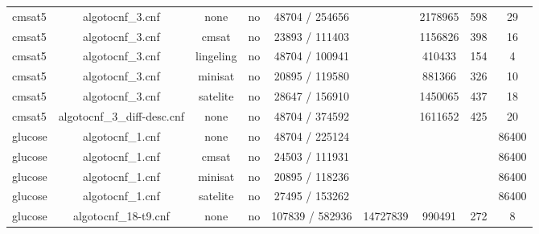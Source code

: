 \begin{appendices}
\begin{table}[p]
\begin{center}
\begin{tabular}{l|cccccccc}
  cmsat5                         & algotocnf\_3.cnf               & none       & no    & 48704 / 254656 &           & 2178965   & 598        & 29 \\ %
  cmsat5                         & algotocnf\_3.cnf               & cmsat      & no    & 23893 / 111403 &           & 1156826   & 398        & 16 \\ %
  cmsat5                         & algotocnf\_3.cnf               & lingeling  & no    & 48704 / 100941 &           & 410433    & 154        & 4 \\ %
  cmsat5                         & algotocnf\_3.cnf               & minisat    & no    & 20895 / 119580 &           & 881366    & 326        & 10 \\ %
  cmsat5                         & algotocnf\_3.cnf               & satelite   & no    & 28647 / 156910 &           & 1450065   & 437        & 18 \\ %
  cmsat5                         & algotocnf\_3\_diff-desc.cnf    & none       & no    & 48704 / 374592 &           & 1611652   & 425        & 20 \\ %
  glucose                        & algotocnf\_1.cnf               & none       & no    & 48704 / 225124 &           &           &            & 86400 \\ %
  glucose                        & algotocnf\_1.cnf               & cmsat      & no    & 24503 / 111931 &           &           &            & 86400 \\ %
  glucose                        & algotocnf\_1.cnf               & minisat    & no    & 20895 / 118236 &           &           &            & 86400 \\ %
  glucose                        & algotocnf\_1.cnf               & satelite   & no    & 27495 / 153262 &           &           &            & 86400 \\ %
  glucose                        & algotocnf\_18-t9.cnf           & none       & no    & 107839 / 582936 & 14727839  & 990491    & 272        & 8 \\ %

\end{tabular}
\end{center}
\end{table}
\end{appendices}
